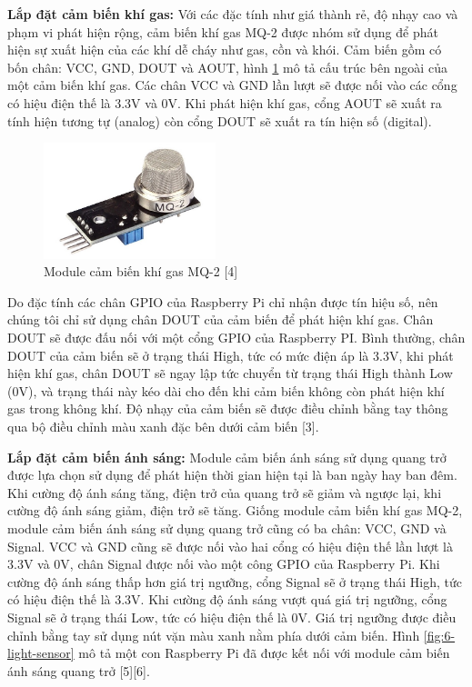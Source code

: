 \documentclass[12pt,a4paper,oneside]{extbook}
\begin{document}
\textbf{Lắp đặt cảm biến khí gas:} Với các đặc tính như giá thành rẻ, độ nhạy cao và phạm vi phát hiện rộng, cảm biến khí gas MQ-2 được nhóm sử dụng để phát hiện sự xuất hiện của các khí dễ cháy như gas, cồn và khói. Cảm biến gồm có bốn chân: VCC, GND, DOUT và AOUT, hình \ref{fig:6-gas-sensor} mô tả cấu trúc bên ngoài của một cảm biến khí gas. Các chân VCC và GND lần lượt sẽ được nối vào các cổng có hiệu điện thế là 3.3V và 0V. Khi phát hiện khí gas, cổng AOUT sẽ xuất ra tính hiện tương tự (analog) còn cổng DOUT sẽ xuất ra tín hiện số (digital).

\begin{figure}[h]
  \centering
     \includegraphics[width=5cm]{6-gas-sensor}
  \caption{Module cảm biến khí gas MQ-2 [4]}\label{fig:6-gas-sensor}
\end{figure}

Do đặc tính các chân GPIO của Raspberry Pi chỉ nhận được tín hiệu số, nên chúng tôi chỉ sử dụng chân DOUT của cảm biến để phát hiện khí gas. Chân DOUT sẽ được đấu nối với một cổng GPIO của Raspberry PI. Bình thường, chân DOUT của cảm biến sẽ ở trạng thái High, tức có mức điện áp là 3.3V, khi phát hiện khí gas, chân DOUT sẽ ngay lập tức chuyển từ trạng thái High thành Low (0V), và trạng thái này kéo dài cho đến khi cảm biến không còn phát hiện khí gas trong không khí. Độ nhạy của cảm biến sẽ được điều chỉnh bằng tay thông qua bộ điều chỉnh màu xanh đặc bên dưới cảm biến [3].

\textbf{Lắp đặt cảm biến ánh sáng:} Module cảm biến ánh sáng sử dụng quang trở được lựa chọn sử dụng để phát hiện thời gian hiện tại là ban ngày hay ban đêm. Khi cường độ ánh sáng tăng, điện trở của quang trở sẽ giảm và ngược lại, khi cường độ ánh sáng giảm, điện trở sẽ tăng. Giống module cảm biến khí gas MQ-2, module cảm biến ánh sáng sử dụng quang trở cũng có ba chân: VCC, GND và Signal. VCC và GND cũng sẽ được nối vào hai cổng có hiệu điện thế lần lượt là 3.3V và 0V, chân Signal được nối vào một công GPIO của Raspberry Pi. 
Khi cường độ ánh sáng thấp hơn giá trị ngưỡng, cổng Signal sẽ ở trạng thái High, tức có hiệu điện thế là 3.3V. Khi cường độ ánh sáng vượt quá giá trị ngưỡng, cổng Signal sẽ ở trạng thái Low, tức có hiệu điện thế là 0V. Giá trị ngưỡng được điều chỉnh bằng  tay sử dụng nút vặn màu xanh nằm phía dưới cảm biến. Hình \ref{fig:6-light-sensor} mô tả một con Raspberry Pi đã được kết nối với module cảm biến ánh sáng quang trở [5][6].
\end{document}
